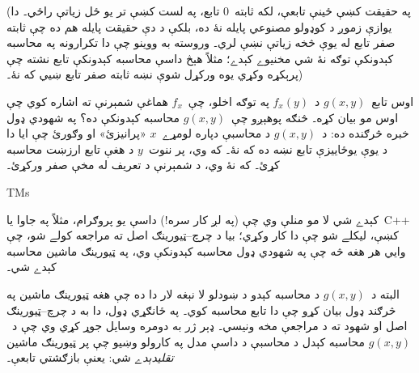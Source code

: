 \documentclass[../../../include/open-logic-section]{subfiles}
\begin{document}
(په حقيقت کښې ځينې تابعې، لکه ثابته~$0$ تابع، په لست کښې تر يو ځل زياتې راځي۔ دا يوازې زموږ د کوډولو مصنوعي پايله نۀ ده، بلکې د دې حقيقت پايله هم ده چې ثابته صفر تابع له يوې څخه زياتې نښې لري۔ وروسته به ووينو چې دا تکرارونه په محاسبه کېدونکې توګه نۀ شي مخنيوے کېدے؛ مثلاً هېڅ داسې محاسبه کېدونکې تابع نشته چې پرېکړه وکړي يوه ورکړل شوې نښه ثابته صفر تابع ښيي که نۀ۔)

اوس تابع~$g(x,y)$ د~$f_x(y)$ په توګه اخلو، چې~$f_x$ هماغې شمېرنې ته اشاره کوي چې اوس مو بيان کړه۔ څنګه پوهېږو چې~$g(x,y)$ محاسبه کېدونکې ده؟ په شهودي ډول خبره څرګنده ده: د~$g(x,y)$ د محاسبې دپاره لومړے~$x$ «پرانيزئ» او وګورئ چې ايا دا د يوې يوځاييزې تابع نښه ده که نۀ۔ که وي، پر ننوت~$y$ د هغې تابع ارزښت محاسبه کړئ۔ که نۀ وي، د شمېرنې د تعريف له مخې صفر ورکړئ۔

\begin{tagblock}{TMs}
\begin{digress}
کېدے شي لا مو منلې وي چې (په لږ کار سره!) داسې يو پروګرام، مثلاً په جاوا يا~C++ کښې، ليکلے شو چې دا کار وکړي؛ بيا د چرچ--ټيورينګ اصل ته مراجعه کولے شو، چې وايي هر هغه څه چې په شهودي ډول محاسبه کېدونکې وي، په ټيورينګ ماشين محاسبه کېدے شي۔

البته د~$g(x,y)$ د محاسبه کېدو د ښودلو لا نېغه لار دا ده چې هغه ټيورينګ ماشين په څرګند ډول بيان کړو چې دا تابع محاسبه کوي۔ په ځانګړي ډول، دا به د چرچ--ټيورينګ اصل او شهود ته د مراجعې مخه ونيسي۔ ډېر ژر به دومره وسايل جوړ کړي وي چې د~$g(x,y)$ محاسبه کېدل د محاسبې د داسې مدل په کارولو وښيو چې پر ټيورينګ ماشين \emph{تقليدېدے} شي: يعنې بازګشتي تابعې۔
\end{digress}
\end{tagblock}
\end{document}
